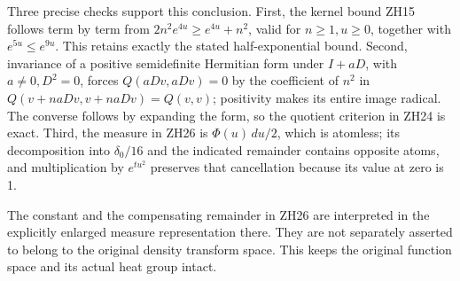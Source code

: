\documentclass[
]{article}
\begin{document}
Three precise checks support this conclusion. First, the kernel bound
ZH15 follows term by term from \(2n^2e^{4u}\ge e^{4u}+n^2\), valid for
\(n\ge1,u\ge0\), together with \(e^{5u}\le e^{9u}\). This retains
exactly the stated half-exponential bound. Second, invariance of a
positive semidefinite Hermitian form under \(I+aD\), with
\(a\ne0,D^2=0\), forces \(Q(aDv,aDv)=0\) by the coefficient of \(n^2\)
in \(Q(v+naDv,v+naDv)=Q(v,v)\); positivity makes its entire image
radical. The converse follows by expanding the form, so the quotient
criterion in ZH24 is exact. Third, the measure in ZH26 is
\(\Phi(u)\,du/2\), which is atomless; its decomposition into
\(\delta_0/16\) and the indicated remainder contains opposite atoms, and
multiplication by \(e^{tu^2}\) preserves that cancellation because its
value at zero is 1.

The constant and the compensating remainder in ZH26 are interpreted in
the explicitly enlarged measure representation there. They are not
separately asserted to belong to the original density transform space.
This keeps the original function space and its actual heat group intact.
\end{document}
